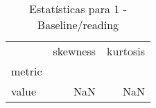 \begin{table}[htbp]
\caption{Estatísticas para 1 - Baseline/reading}
\label{tab:1_-_baseline_reading_skewkurt}
\begin{tabular}{lrr}
\toprule
 & skewness & kurtosis \\
metric &  &  \\
\midrule
value & NaN & NaN \\
\bottomrule
\end{tabular}
\end{table}
